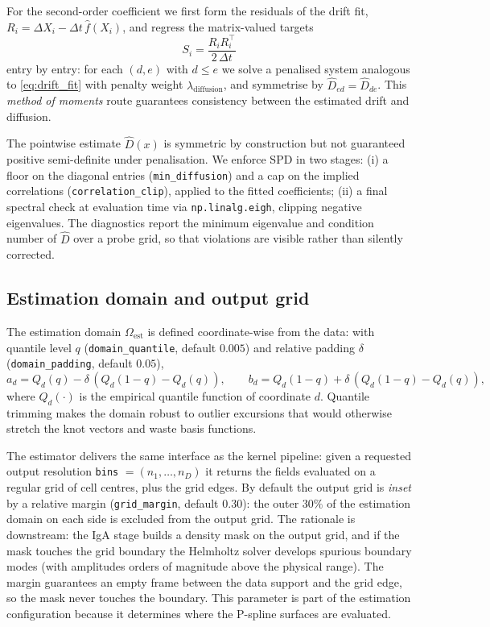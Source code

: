 \documentclass[11pt,a4paper]{article}
\newcommand{\topT}{^{\top}}
\begin{document}
For the second-order coefficient we first form the residuals of the drift fit,
$R_i = \Delta X_i - \Delta t\, \hat f(X_i)$, and regress the matrix-valued
targets
\begin{equation}
S_i = \frac{R_i R_i\topT}{2\,\Delta t}
\label{eq:diff_target}
\end{equation}
entry by entry: for each $(d, e)$ with $d \le e$ we solve a penalised system
analogous to \eqref{eq:drift_fit} with penalty weight
$\lambda_{\mathrm{diffusion}}$, and symmetrise by
$\hat D_{ed} = \hat D_{de}$. This \emph{method of moments} route guarantees
consistency between the estimated drift and diffusion.

The pointwise estimate $\hat D(x)$ is symmetric by construction but not
guaranteed positive semi-definite under penalisation. We enforce SPD in two
stages: (i) a floor on the diagonal entries (\texttt{min\_diffusion}) and a
cap on the implied correlations (\texttt{correlation\_clip}), applied to the
fitted coefficients; (ii) a final spectral check at evaluation time via
\texttt{np.linalg.eigh}, clipping negative eigenvalues. The diagnostics report
the minimum eigenvalue and condition number of $\hat D$ over a probe grid, so
that violations are visible rather than silently corrected.

\subsection{Estimation domain and output grid}
\label{sec:domain}

The estimation domain $\Omega_{\mathrm{est}}$ is defined coordinate-wise from
the data: with quantile level $q$ (\texttt{domain\_quantile}, default $0.005$)
and relative padding $\delta$ (\texttt{domain\_padding}, default $0.05$),
\begin{equation}
a_d = Q_d(q) - \delta\, (Q_d(1-q) - Q_d(q)),
\qquad
b_d = Q_d(1-q) + \delta\, (Q_d(1-q) - Q_d(q)),
\label{eq:domain}
\end{equation}
where $Q_d(\cdot)$ is the empirical quantile function of coordinate $d$.
Quantile trimming makes the domain robust to outlier excursions that would
otherwise stretch the knot vectors and waste basis functions.

The estimator delivers the same interface as the kernel pipeline: given a
requested output resolution \texttt{bins} $= (n_1, \dots, n_D)$ it returns the
fields evaluated on a regular grid of cell centres, plus the grid edges. By
default the output grid is \emph{inset} by a relative margin
(\texttt{grid\_margin}, default $0.30$): the outer $30\%$ of the estimation
domain on each side is excluded from the output grid. The rationale is
downstream: the IgA stage builds a density mask on the output grid, and if the
mask touches the grid boundary the Helmholtz solver develops spurious boundary
modes (with amplitudes orders of magnitude above the physical range). The
margin guarantees an empty frame between the data support and the grid edge,
so the mask never touches the boundary. This parameter is part of the
estimation configuration because it determines where the P-spline surfaces are
evaluated.
\end{document}
